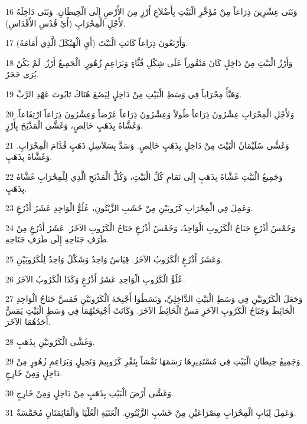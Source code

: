 \par 16 وَبَنَى عِشْرِينَ ذِرَاعاً مِنْ مُؤَخَّرِ الْبَيْتِ بِأَضْلاَعِ أَرْزٍ مِنَ الأَرْضِ إِلَى الْحِيطَانِ. وَبَنَى دَاخِلَهُ لأَجْلِ الْمِحْرَابِ (أَيْ قُدْسِ الأَقْدَاسِ).
\par 17 وَأَرْبَعُونَ ذِرَاعاً كَانَتِ الْبَيْتَ (أَيِ الْهَيْكَلَ الَّذِي أَمَامَهُ).
\par 18 وَأَرْزُ الْبَيْتِ مِنْ دَاخِلٍ كَانَ مَنْقُوراً عَلَى شِكْلِ قُثَّاءٍ وَبَرَاعِمِ زُهُورٍ. الْجَمِيعُ أَرْزٌ. لَمْ يَكُنْ يُرَى حَجَرٌ.
\par 19 وَهَيَّأَ مِحْرَاباً فِي وَسَطِ الْبَيْتِ مِنْ دَاخِلٍ لِيَضَعَ هُنَاكَ تَابُوتَ عَهْدِ الرَّبِّ.
\par 20 وَلأَجْلِ الْمِحْرَابِ عِشْرُونَ ذِرَاعاً طُولاً وَعِشْرُونَ ذِرَاعاً عَرْضاً وَعِشْرُونَ ذِرَاعاً ارْتِفَاعاً. وَغَشَّاهُ بِذَهَبٍ خَالِصٍ، وَغَشَّى الْمَذْبَحَ بِأَرْزٍ.
\par 21 وَغَشَّى سُلَيْمَانُ الْبَيْتَ مِنْ دَاخِلٍ بِذَهَبٍ خَالِصٍ. وَسَدَّ بِسَلاَسِلِ ذَهَبٍ قُدَّامَ الْمِحْرَابِ. وَغَشَّاهُ بِذَهَبٍ.
\par 22 وَجَمِيعُ الْبَيْتِ غَشَّاهُ بِذَهَبٍ إِلَى تَمَامِ كُلِّ الْبَيْتِ، وَكُلُّ الْمَذْبَحِ الَّذِي لِلْمِحْرَابِ غَشَّاهُ بِذَهَبٍ.
\par 23 وَعَمِلَ فِي الْمِحْرَابِ كَرُوبَيْنِ مِنْ خَشَبِ الزَّيْتُونِ، عُلُوُّ الْوَاحِدِ عَشَرُ أَذْرُعٍ.
\par 24 وَخَمْسُ أَذْرُعٍ جَنَاحُ الْكَرُوبِ الْوَاحِدُ، وَخَمْسُ أَذْرُعٍ جَنَاحُ الْكَرُوبِ الآخَرُ. عَشَرُ أَذْرُعٍ مِنْ طَرَفِ جَنَاحِهِ إِلَى طَرَفِ جَنَاحِهِ.
\par 25 وَعَشَرُ أَذْرُعٍ الْكَرُوبُ الآخَرُ. قِيَاسٌ وَاحِدٌ وَشَكْلٌ وَاحِدٌ لِلْكَرُوبَيْنِ.
\par 26 عُلُوُّ الْكَرُوبِ الْوَاحِدِ عَشَرُ أَذْرُعٍ وَكَذَا الْكَرُوبُ الآخَرُ.
\par 27 وَجَعَلَ الْكَرُوبَيْنِ فِي وَسَطِ الْبَيْتِ الدَّاخِلِيِّ، وَبَسَطُوا أَجْنِحَةَ الْكَرُوبَيْنِ فَمَسَّ جَنَاحُ الْوَاحِدِ الْحَائِطَ وَجَنَاحُ الْكَرُوبِ الآخَرِ مَسَّ الْحَائِطَ الآخَرَ. وَكَانَتْ أَجْنِحَتُهُمَا فِي وَسَطِ الْبَيْتِ يَمَسُّ أَحَدُهُمَا الآخَرَ.
\par 28 وَغَشَّى الْكَرُوبَيْنِ بِذَهَبٍ.
\par 29 وَجَمِيعُ حِيطَانِ الْبَيْتِ فِي مُسْتَدِيرِهَا رَسَمَهَا نَقْشاً بِنَقْرِ كَرُوبِيمَ وَنَخِيلٍ وَبَرَاعِمِ زُهُورٍ مِنْ دَاخِلٍ وَمِنْ خَارِجٍ.
\par 30 وَغَشَّى أَرْضَ الْبَيْتِ بِذَهَبٍ مِنْ دَاخِلٍ وَمِنْ خَارِجٍ.
\par 31 وَعَمِلَ لِبَابِ الْمِحْرَابِ مِصْرَاعَيْنِ مِنْ خَشَبِ الزَّيْتُونِ. الْعَتَبَةِ الْعُلْيَا وَالْقَائِمَتَانِ مُخَمَّسَةٌ.
